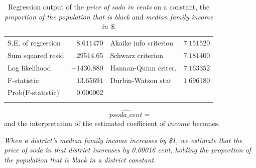 \documentclass[12pt]{report}
\begin{document}
\begin{table}[H]
\begin{tabular}{lrrrr}
		\multicolumn{1}{l}{S.E. of regression}&\multicolumn{1}{r}{$8.611470$}&\multicolumn{2}{l}{Akaike info criterion}&\multicolumn{1}{r}{$7.151520$}\\
		\multicolumn{1}{l}{Sum squared resid}&\multicolumn{1}{r}{$29514.65$}&\multicolumn{2}{l}{Schwarz criterion}&\multicolumn{1}{r}{$7.181400$}\\
		\multicolumn{1}{l}{Log likelihood}&\multicolumn{1}{r}{$-1430.880$}&\multicolumn{2}{l}{Hannan-Quinn criter.}&\multicolumn{1}{r}{$7.163352$}\\
		\multicolumn{1}{l}{F-statistic}&\multicolumn{1}{r}{$13.65691$}&\multicolumn{2}{l}{Durbin-Watson stat}&\multicolumn{1}{r}{$1.696180$}\\
		\multicolumn{1}{l}{Prob(F-statistic)}&\multicolumn{1}{r}{$0.000002$}&\multicolumn{1}{c}{}&\multicolumn{1}{c}{}&\multicolumn{1}{c}{}\\
		[4.5pt] \hline \\ [-4.5pt]
	\end{tabular}
	\caption{Regression output of the \textit{price of soda in cents} on a constant, the \textit{proportion of the population that is black} and \textit{median family income in \$}.}
\end{table}
\vspace{-\baselineskip}
$$\widehat{psoda\_cent} = $$
\noindent and the interpretation of the estimated coefficient of $income$ becomes,

\centering
\textit{When a district’s median family income increases by \$1, we estimate that the price of soda in that district increases by 0.00016 cent, holding the proportion of the population that is black in a district constant.}
\end{document}
